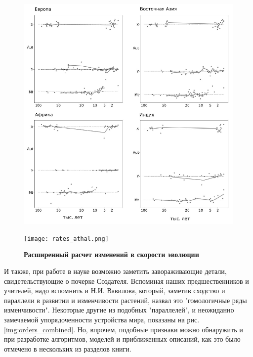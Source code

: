 \begin{figure}[H]
  \centering
  \vskip 12pt
  \begin{minipage}[ht]{0.5\linewidth}\centering
    \includegraphics[width=0.99\linewidth]{h_evol_extrates.png} \\ 
  \end{minipage}
  \hfill
  \begin{minipage}[t]{0.35\linewidth}\centering
    \texttt{[image: rates\_athal.png]} \\ 
  \end{minipage}
  \vskip 12pt
  \caption[m1]{
  \textbf{Расширенный расчет изменений в скорости эволюции}\itshape
} 
 \label{img:evol_ext_rates}
\end{figure}

И также, при работе в науке возможно заметить завораживающие детали, свидетельствующие о почерке Создателя. Вспоминая наших предшественников и учителей, надо вспомнить и Н.И. Вавилова, который, заметив сходство и параллели в развитии и изменчивости растений, назвал это "гомологичные ряды изменчивости". Некоторые другие из подобных "параллелей", и неожиданно замечаемой упорядоченности устройства мира, показаны на рис. \ref{img:orders_combined}. Но, впрочем, подобные признаки можно обнаружить и при разработке алгоритмов, моделей и приближенных описаний, как это было отмечено в нескольких из разделов книги. 

